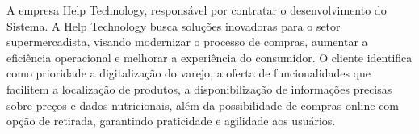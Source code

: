 \hspace{4.5mm}
A empresa Help Technology, responsável por contratar o desenvolvimento do Sistema. A Help Technology busca  soluções inovadoras para o setor supermercadista, visando modernizar o processo de compras, aumentar a eficiência operacional e melhorar a experiência do consumidor. O cliente identifica como prioridade a digitalização do varejo, a oferta de funcionalidades que facilitem a localização de produtos, a disponibilização de informações precisas sobre preços e dados nutricionais, além da possibilidade de compras online com opção de retirada, garantindo praticidade e agilidade aos usuários. 